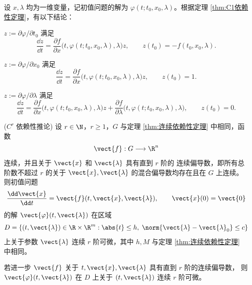 \begin{corollary}\label{cor:解对初值和参数的偏导方程}
	设 $x,\lambda$ 均为一维变量，记初值问题的解为
	$\varphi(t;t_0,x_0,\lambda)$。根据定理
	\ref{thm:C1依赖性定理}，有以下结论：

	$z\mathrel{:=}\partial\varphi/\partial t_0$ 满足
	\[
		\dfrac{\dd z}{\dd t}
		=\dfrac{\partial f}{\partial x}
		\bigl(t,\varphi(t;t_0,x_0,\lambda),\lambda\bigr)z,
		\qquad
		z(t_0)=-f(t_0,x_0,\lambda).
	\]

	$z\mathrel{:=}\partial\varphi/\partial x_0$ 满足
	\[
		\dfrac{\dd z}{\dd t}
		=\dfrac{\partial f}{\partial x}
		\bigl(t,\varphi(t;t_0,x_0,\lambda),\lambda\bigr)z,
		\qquad
		z(t_0)=1.
	\]

	$z\mathrel{:=}\partial\varphi/\partial\lambda$ 满足
	\[
		\dfrac{\dd z}{\dd t}
		=\dfrac{\partial f}{\partial x}
		\bigl(t,\varphi(t;t_0,x_0,\lambda),\lambda\bigr)z
		+\dfrac{\partial f}{\partial\lambda}
		\bigl(t,\varphi(t;t_0,x_0,\lambda),\lambda\bigr),
		\qquad
		z(t_0)=0.
	\]
\end{corollary}
\begin{corollary}($C^r$ 依赖性推论)\label{cor:Cr依赖性推论}
	设 $r\in\N$，$r\geq1$，$G$ 与定理
	\ref{thm:连续依赖性定理} 中相同，函数
	\[
	\vect{f}:G\longrightarrow\R^n
	\]
	连续，并且关于 $\vect{x}$ 和 $\vect{\lambda}$ 具有直到 $r$ 阶的
	连续偏导数，即所有总阶数不超过 $r$ 的关于
	$\vect{x},\vect{\lambda}$ 的混合偏导数均存在且在 $G$ 上连续。
	则初值问题
	\[
	\frac{\dd\vect{x}}{\dd t}
	=
	\vect{f}(t,\vect{x},\vect{\lambda}),
	\qquad
	\vect{x}(0)=\vect{0}
	\]
	的解 $\vect{\varphi}(t,\vect{\lambda})$ 在区域
	\[
	D=
	\left\{
	(t,\vect{\lambda})\in\R\times\R^m:
	\abs{t}\leq h,\;
	\norm{\vect{\lambda}-\vect{\lambda}_0}\leq c
	\right\}
	\]
	上关于参数 $\vect{\lambda}$ 连续 $r$ 阶可微，其中 $h,M$
	与定理 \ref{thm:连续依赖性定理} 中相同。
	
	若进一步 $\vect{f}$ 关于
	$t,\vect{x},\vect{\lambda}$ 具有直到 $r$ 阶的连续偏导数，
	则 $\vect{\varphi}(t,\vect{\lambda})$ 在 $D$ 上关于
	$(t,\vect{\lambda})$ 连续 $r$ 阶可微。
\end{corollary}


